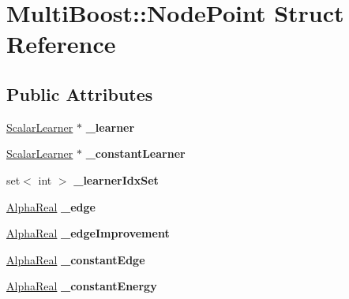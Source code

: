 \hypertarget{structMultiBoost_1_1NodePoint}{
\section{MultiBoost::NodePoint Struct Reference}
\label{structMultiBoost_1_1NodePoint}
}
\subsection*{Public Attributes}
\begin{DoxyCompactItemize}
\item 
\hypertarget{structMultiBoost_1_1NodePoint_a0f8fa3fa99b54a40000e7c3711d2b493}{
\hyperlink{classMultiBoost_1_1ScalarLearner}{ScalarLearner} $\ast$ {\bfseries \_\-learner}}
\label{structMultiBoost_1_1NodePoint_a0f8fa3fa99b54a40000e7c3711d2b493}

\item 
\hypertarget{structMultiBoost_1_1NodePoint_a0e4e26d55ea8457acc5398de11ef1316}{
\hyperlink{classMultiBoost_1_1ScalarLearner}{ScalarLearner} $\ast$ {\bfseries \_\-constantLearner}}
\label{structMultiBoost_1_1NodePoint_a0e4e26d55ea8457acc5398de11ef1316}

\item 
\hypertarget{structMultiBoost_1_1NodePoint_a3cf336503896a6e815584c6d7518d56c}{
set$<$ int $>$ {\bfseries \_\-learnerIdxSet}}
\label{structMultiBoost_1_1NodePoint_a3cf336503896a6e815584c6d7518d56c}

\item 
\hypertarget{structMultiBoost_1_1NodePoint_a29a1e23eeff9ea9d42a2b3e4c57b69e5}{
\hyperlink{Defaults_8h_a80184c4fd10ab70a1a17c5f97dcd1563}{AlphaReal} {\bfseries \_\-edge}}
\label{structMultiBoost_1_1NodePoint_a29a1e23eeff9ea9d42a2b3e4c57b69e5}

\item 
\hypertarget{structMultiBoost_1_1NodePoint_ab13b82927e1d2d5606ad053dcd68e521}{
\hyperlink{Defaults_8h_a80184c4fd10ab70a1a17c5f97dcd1563}{AlphaReal} {\bfseries \_\-edgeImprovement}}
\label{structMultiBoost_1_1NodePoint_ab13b82927e1d2d5606ad053dcd68e521}

\item 
\hypertarget{structMultiBoost_1_1NodePoint_aaf1fb7d48e4d6fde57a60b1d26122cf3}{
\hyperlink{Defaults_8h_a80184c4fd10ab70a1a17c5f97dcd1563}{AlphaReal} {\bfseries \_\-constantEdge}}
\label{structMultiBoost_1_1NodePoint_aaf1fb7d48e4d6fde57a60b1d26122cf3}

\item 
\hypertarget{structMultiBoost_1_1NodePoint_aec07cbbb980b1cc8dc8359a6cf814620}{
\hyperlink{Defaults_8h_a80184c4fd10ab70a1a17c5f97dcd1563}{AlphaReal} {\bfseries \_\-constantEnergy}}
\label{structMultiBoost_1_1NodePoint_aec07cbbb980b1cc8dc8359a6cf814620}


\end{DoxyCompactItemize}
